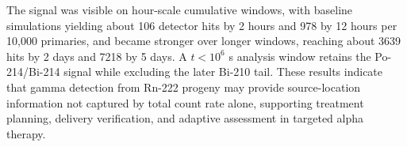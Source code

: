 \documentclass[11pt,a4paper]{article}
\begin{document}
The signal was visible on hour-scale cumulative windows, with baseline
simulations yielding about 106 detector hits by 2 hours and 978 by
12 hours per 10,000 primaries, and became stronger over longer windows,
reaching about 3639 hits by 2 days and 7218 by 5 days. A \(t<10^6\) s
analysis window retains the Po-214/Bi-214 signal while excluding the later
Bi-210 tail. These results
indicate that gamma detection from Rn-222 progeny may provide
source-location information not captured by total count rate alone,
supporting treatment planning, delivery verification, and adaptive
assessment in targeted alpha therapy.
\end{document}

